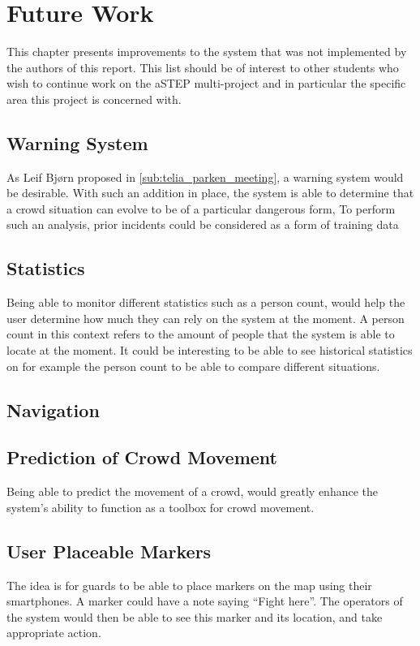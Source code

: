 \chapter{Future Work}
\label{ch:future_work}

This chapter presents improvements to the system that was not implemented by the authors of this report. This list should be of interest to other students who wish to continue work on the aSTEP multi-project and in particular the specific area this project is concerned with.

\section{Warning System}
As Leif Bjørn proposed in \cref{sub:telia_parken_meeting}, a warning system would be desirable. With such an addition in place, the system is able to determine that a crowd situation can  evolve to be of a particular dangerous form, To perform such an analysis, prior incidents could be considered as a form of training data

\section{Statistics}
Being able to monitor different statistics such as a person count, would help the user determine how much they can rely on the system at the moment. A person count in this context refers to the amount of people that the system is able to locate at the moment. It could be interesting to be able to see historical statistics on for example the person count to be able to compare different situations.

\section{Navigation}

\section{Prediction of Crowd Movement}
Being able to predict the movement of a crowd, would greatly enhance the system's ability to function as a toolbox for crowd movement.

\section{User Placeable Markers}
The idea is for guards to be able to place markers on the map using their smartphones. A marker could have a note saying \enquote{Fight here}. The operators of the system would then be able to see this marker and its location, and take appropriate action.

